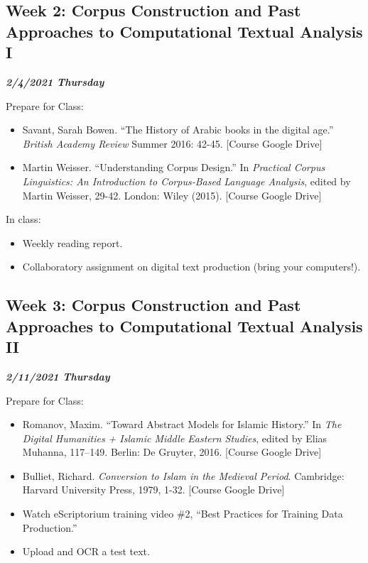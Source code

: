 \documentclass[
]{book}
\providecommand{\tightlist}{%
  \setlength{\itemsep}{0pt}\setlength{\parskip}{0pt}}
\begin{document}
\hypertarget{week-2-corpus-construction-and-past-approaches-to-computational-textual-analysis-i}{%
\subsection{Week 2: Corpus Construction and Past Approaches to Computational Textual Analysis I}\label{week-2-corpus-construction-and-past-approaches-to-computational-textual-analysis-i}}

\textbf{\emph{2/4/2021 Thursday}}

Prepare for Class:

\begin{itemize}
\tightlist
\item
  Savant, Sarah Bowen. ``The History of Arabic books in the digital age.'' \emph{British Academy Review} Summer 2016: 42-45. {[}Course Google Drive{]}
\item
  Martin Weisser. ``Understanding Corpus Design.'' In \emph{Practical Corpus Linguistics: An Introduction to Corpus‐Based Language Analysis}, edited by Martin Weisser, 29-42. London: Wiley (2015). {[}Course Google Drive{]}
\end{itemize}

In class:

\begin{itemize}
\tightlist
\item
  Weekly reading report.
\item
  Collaboratory assignment on digital text production (bring your computers!).
\end{itemize}

\hypertarget{week-3-corpus-construction-and-past-approaches-to-computational-textual-analysis-ii}{%
\subsection{Week 3: Corpus Construction and Past Approaches to Computational Textual Analysis II}\label{week-3-corpus-construction-and-past-approaches-to-computational-textual-analysis-ii}}

\textbf{\emph{2/11/2021 Thursday}}

Prepare for Class:

\begin{itemize}
\tightlist
\item
  Romanov, Maxim. ``Toward Abstract Models for Islamic History.'' In \emph{The Digital Humanities + Islamic Middle Eastern Studies}, edited by Elias Muhanna, 117--149. Berlin: De Gruyter, 2016. {[}Course Google Drive{]}
\item
  Bulliet, Richard. \emph{Conversion to Islam in the Medieval Period}. Cambridge: Harvard University Press, 1979, 1-32. {[}Course Google Drive{]}
\item
  Watch eScriptorium training video \#2, ``Best Practices for Training Data Production.''
\item
  Upload and OCR a test text.
\end{itemize}
\end{document}
